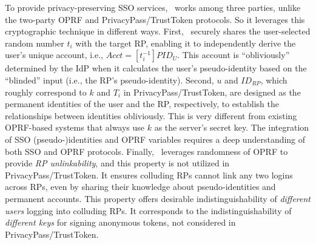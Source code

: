 To provide privacy-preserving SSO services, \usso\ works among three parties, unlike the two-party OPRF and PrivacyPass/TrustToken protocols.
So it leverages this cryptographic technique in different ways. %
First, \usso\ securely shares the user-selected random number $t_i$ with the target RP,
enabling it to independently derive the user's unique account, i.e., $Acct = [t_i^{-1}]PID_{U}$. This account is ``obliviously'' determined by the IdP when it calculates the user's pseudo-identity based on the ``blinded'' input (i.e., the RP's pseudo-identity). Second, $u$ and $ID_{RP}$, which roughly correspond to $k$ and $T_i$ in PrivacyPass/TrustToken, are designed as the permanent identities of the user and the RP, respectively, to establish the relationships between identities obliviously.
This is very different from existing OPRF-based systems  \cite{privacypass, trusttoken, strong-oprf, oprf-bitcoin-wallet, pesto, oprf-ot-si, pp-ss, Private-Contact-Discovery, o-kms, oprf-deduplication} that always use $k$ as the server's secret key.
The integration of SSO (pseudo-)identities  and OPRF variables requires a deep understanding of both SSO and OPRF protocols.
Finally, \usso\ leverages randomness of OPRF to provide \emph{RP unlinkability}, and this property is not utilized in PrivacyPass/TrustToken.
It ensures colluding RPs cannot link any two logins across RPs, %
even by sharing their knowledge about pseudo-identities and permanent accounts.
This property offers desirable indistinguishability of \emph{different users} logging into colluding RPs.
It corresponds to the indistinguishability of \emph{different keys} for signing anonymous tokens, not considered in PrivacyPass/TrustToken. %

